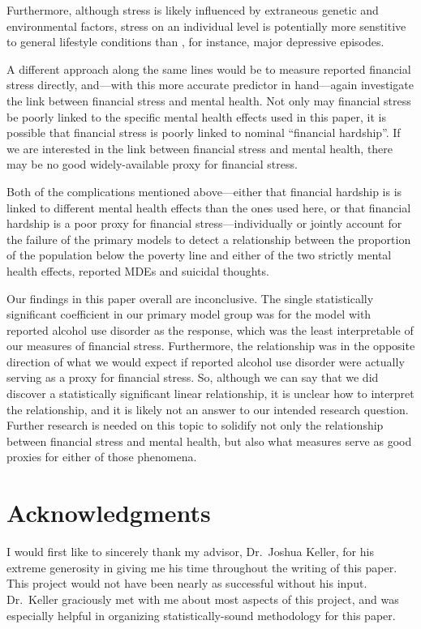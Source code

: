 \documentclass{article}
\begin{document}
Furthermore, although stress is likely influenced by
extraneous genetic and environmental factors,
stress on an individual level is potentially more
senstitive to general lifestyle conditions than
, for instance,
major depressive episodes.

A different approach along the same lines would be
to measure reported financial stress directly,
and---with this more accurate predictor in hand---again
investigate the link between financial stress
and mental health.
Not only may financial stress be poorly linked to
the specific mental health effects used in this paper,
it is possible that financial stress is poorly linked
to nominal ``financial hardship''.
If we are interested in the link between financial stress and mental health,
there may be no good widely-available proxy for financial stress.

Both of the complications mentioned above---either
that financial hardship is is linked to different mental
health effects than the ones used here,
or that financial hardship is a poor proxy for financial
stress---individually or jointly account for the
failure of the primary models to detect a relationship
between the proportion of the population below the poverty line
and either of the two strictly mental health effects,
reported MDEs and suicidal thoughts.

Our findings in this paper overall are inconclusive.
The single statistically significant coefficient
in our primary model group was
for the model with reported alcohol use disorder
as the response,
which was the least interpretable of our
measures of financial stress.
Furthermore, the relationship was in the opposite
direction of what we would expect
if reported alcohol use disorder were actually
serving as a proxy for financial stress.
So, although we can say that we did discover
a statistically significant linear relationship,
it is unclear how to interpret the relationship,
and it is likely not an answer to our intended
research question.
Further research is needed on this topic
to solidify not only the relationship between
financial stress and mental health,
but also what measures serve as good proxies
for either of those phenomena.

\section{Acknowledgments}

I would first like to sincerely thank my advisor,
Dr.\ Joshua Keller, for his extreme generosity in giving
me his time throughout the writing of this paper.
This project would not have been nearly as successful
without his input.
Dr.\ Keller graciously met with me about most
aspects of this project, and was especially
helpful in organizing statistically-sound
methodology for this paper.
\end{document}
